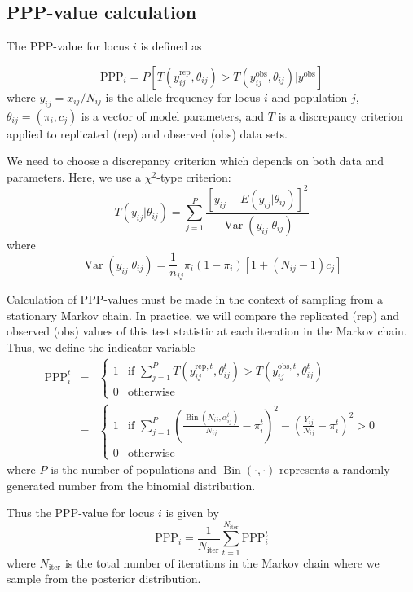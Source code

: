 \documentclass[a4paper,12pt]{article}
\begin{document}
\subsection{PPP-value calculation}

The PPP-value for locus $i$ is defined as

$$\text{PPP}_i = 
P\left[T(y_{ij}^{\text{rep}},\theta_{ij})>
       T(y_{ij}^{\text{obs}},\theta_{ij})|y^{\text{obs}}\right]
$$
where $y_{ij}=x_{ij}/N_{ij}$ is the allele frequency for locus $i$ and
population $j$, $\theta_{ij}=(\pi_i,c_j)$ is a vector of model
parameters, and $T$ is a discrepancy criterion applied to replicated
(rep) and observed (obs) data sets.

We need to choose a discrepancy criterion which depends on both data
and parameters. Here, we use a $\chi^2$-type criterion:
$$T(y_{ij}|\theta_{ij}) = \sum_{j=1}^P 
\frac{\left[y_{ij} - E(y_{ij}|\theta_{ij})\right]^2}{
  \operatorname{Var}(y_{ij}|\theta_{ij})}
$$
where
$$
\operatorname{Var}(y_{ij}|\theta_{ij}) = 
\frac 1 n_{ij} \pi_i(1-\pi_i)
\left[1+(N_{ij}-1)c_j\right]
$$

Calculation of PPP-values must be made in the context of sampling from
a stationary Markov chain. In practice, we will compare the
replicated (rep) and observed (obs) values of this test statistic at
each iteration in the Markov chain. Thus, we define the indicator
variable
\begin{eqnarray*}
\text{PPP}_i^t &=&
\begin{cases}
  1 & \text{if }\sum_{j=1}^P T(y_{ij}^{\text{rep},t},\theta_{ij}^t) 
                          > T(y_{ij}^{\text{obs},t},\theta_{ij}^t) \\
  0 & \text{otherwise}
\end{cases}\\
&=&
\begin{cases} 
1 & 
\text{if }
\sum_{j=1}^P
\left(
\frac{\operatorname{Bin}(N_{ij},\alpha_{ij}^t)}{N_{ij}} - \pi_i^t
\right)^2
-
\left(
\frac{Y_{ij}}{N_{ij}} - \pi_i^t
\right)^2
>0
\\
0 & \text{otherwise}
\end{cases}
\end{eqnarray*}
where $P$ is the number of populations and
$\operatorname{Bin}(\cdot,\cdot)$ represents a randomly generated
number from the binomial distribution.

Thus the PPP-value for locus $i$ is given by
$$
\text{PPP}_i = \frac 1 {N_{\text{iter}}} 
\sum_{t=1}^{N_{\text{iter}}} \text{PPP}_{i}^t
$$
where $N_{\text{iter}}$ is the total number of iterations in the
Markov chain where we sample from the posterior distribution.
\end{document}
